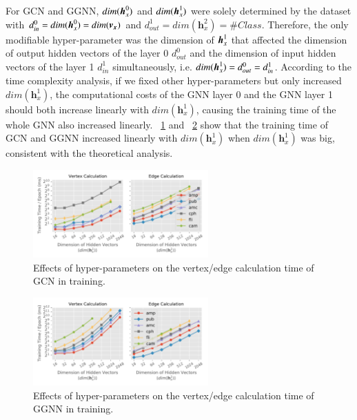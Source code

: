 
For GCN and GGNN, $dim(\boldsymbol{h}^0_x)$ and $dim(\boldsymbol{h}^1_x)$ were solely determined by the dataset with $d^0_{in} = dim(\boldsymbol{h}^0_x) = dim(\boldsymbol{v_x})$ and $d^1_{out} = dim(\boldsymbol{h}^2_x)=\#Class$.
%
Therefore, the only modifiable hyper-parameter was the dimension of $\boldsymbol{h}^1_x$ that affected the dimension of output hidden vectors of the layer 0 $d^0_{out}$ and the dimension of input hidden vectors of the layer 1 $d^1_{in}$ simultaneously, i.e. $dim(\boldsymbol{h}^1_x)  = d^0_{out} = d^1_{in}$.
%
According to the time complexity analysis, if we fixed other hyper-parameters but only increased $dim(\boldsymbol{h}^1_x)$, the computational costs of the GNN layer 0 and the GNN layer 1 should both increase linearly with $dim(\boldsymbol{h}^1_x)$, causing the training time of the whole GNN also increased linearly. 
%
\figurename~\ref{fig:exp_hyperparameter_on_vertex_edge_phase_time_gcn} and \figurename~\ref{fig:exp_hyperparameter_on_vertex_edge_phase_time_ggnn} show that the training time of GCN and GGNN increased linearly with $dim(\boldsymbol{h}^1_x)$ when $dim(\boldsymbol{h}^1_x)$ was big, consistent with the theoretical analysis.

\begin{figure}[H]
    \centering
    \includegraphics[width=0.6\textwidth]{figs/experiments/exp_hyperparameter_on_vertex_edge_phase_time_gcn.pdf}
    \caption{Effects of hyper-parameters on the vertex/edge calculation time of GCN in training.}
    \label{fig:exp_hyperparameter_on_vertex_edge_phase_time_gcn}
\end{figure}

\begin{figure}[H]
    \centering
    \includegraphics[width=0.6\textwidth]{figs/experiments/exp_hyperparameter_on_vertex_edge_phase_time_ggnn.pdf}
    \caption{Effects of hyper-parameters on the vertex/edge calculation time of GGNN in training.}
    \label{fig:exp_hyperparameter_on_vertex_edge_phase_time_ggnn}
\end{figure}

